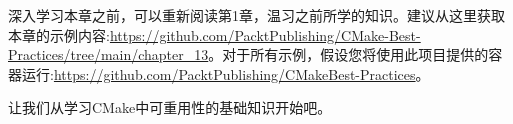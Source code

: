 深入学习本章之前，可以重新阅读第1章，温习之前所学的知识。建议从这里获取本章的示例内容:\url{https://github.com/PacktPublishing/CMake-Best-Practices/tree/main/chapter\_13}。对于所有示例，假设您将使用此项目提供的容器运行:\url{https://github.com/PacktPublishing/CMakeBest-Practices}。

让我们从学习CMake中可重用性的基础知识开始吧。